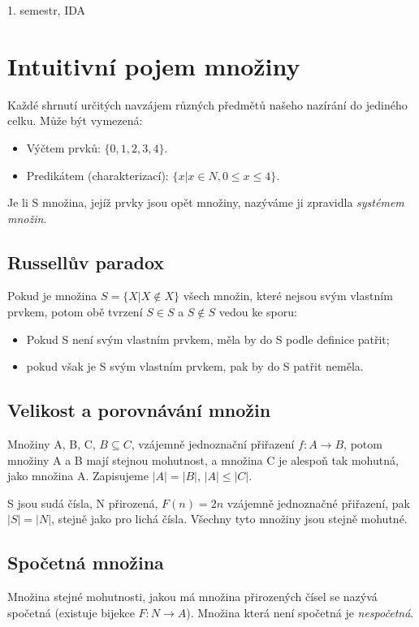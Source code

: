\documentclass[a4paper, 11pt]{report}
\begin{document}
1. semestr, IDA

\section{Intuitivní pojem množiny}

Každé shrnutí určitých navzájem různých předmětů našeho nazírání do jediného celku. Může být vymezená:
\begin{itemize}
	\item Výčtem prvků: $\{0, 1, 2, 3, 4\}$.
	\item Predikátem (charakterizací): $\{x | x \in N, 0 \leq x \leq 4\}$.
\end{itemize}

Je li S množina, jejíž prvky jsou opět množiny, nazýváme ji zpravidla \emph{systémem množin}.

\subsection{Russellův paradox}

Pokud je množina $S = \{ X | X \notin X\}$ všech množin, které nejsou svým vlastním prvkem, potom obě tvrzení $ S \in S $ a $ S \notin S$ vedou ke sporu:
\begin{itemize}
	\item Pokud S není svým vlastním prvkem, měla by do S podle definice patřit;
	\item pokud však je S svým vlastním prvkem, pak by do S patřit neměla.
\end{itemize}

\subsection{Velikost a porovnávání množin}

Množiny A, B, C, $B \subseteq C $, vzájemně jednoznační přiřazení $f: A  \to B$, potom množiny A a B mají stejnou mohutnost, a množina C je alespoň tak mohutná, jako množina A. Zapisujeme $|A| = |B|$, $|A| \leq |C|$.

S jsou sudá čísla, N přirozená, $F(n) = 2n$ vzájemně jednoznačné přiřazení, pak $|S| = |N|$, stejně jako pro lichá čísla. Všechny tyto množiny jsou stejně mohutné.

\subsection{Spočetná množina}
Množina stejné mohutnosti, jakou má množina přirozených čísel se nazývá spočetná (existuje bijekce $F: N \to A$). Množina která není spočetná je \emph{nespočetná}.
\end{document}
